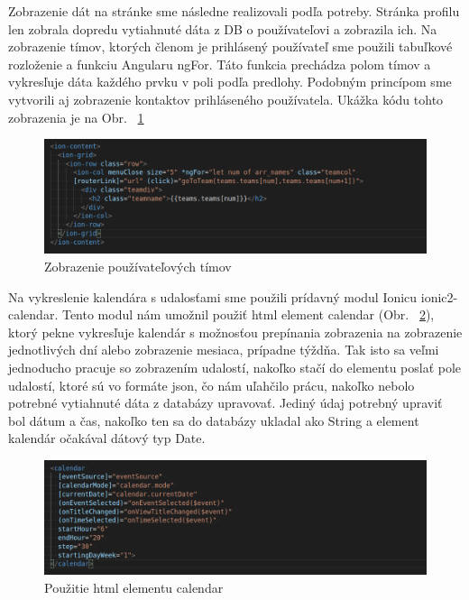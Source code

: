 \indent Zobrazenie dát na stránke sme následne realizovali podľa potreby. Stránka profilu len zobrala dopredu vytiahnuté dáta z DB o používateľovi a zobrazila ich. Na zobrazenie tímov, ktorých členom je prihlásený používateľ sme použili tabuľkové rozloženie a funkciu Angularu ngFor. Táto funkcia prechádza polom tímov a vykresľuje dáta každého prvku v poli podľa predlohy. Podobným princípom sme vytvorili aj zobrazenie kontaktov prihláseného používatela. Ukážka kódu tohto zobrazenia je na Obr. ~\ref{fig:teams}

\begin{figure}[H]
    \centering
    \includegraphics[scale=0.45]{img/imp/teams.png}
    \caption{Zobrazenie používateľových tímov}
    \label{fig:teams}
\end{figure}

\indent Na vykreslenie kalendára s udalosťami sme použili prídavný modul Ionicu ionic2-calendar. Tento modul nám umožnil použiť html element calendar (Obr. ~\ref{fig:calendar}), ktorý pekne vykresľuje kalendár s možnosťou prepínania zobrazenia na zobrazenie jednotlivých dní alebo zobrazenie mesiaca, prípadne týždňa. Tak isto sa veľmi jednoducho pracuje so zobrazením udalostí, nakoľko stačí do elementu poslať pole udalostí, ktoré sú vo formáte json, čo nám uľahčilo prácu, nakoľko nebolo potrebné vytiahnuté dáta z databázy upravovať. Jediný údaj potrebný upraviť bol dátum a čas, nakoľko ten sa do databázy ukladal ako String a element kalendár očakával dátový typ Date.

\begin{figure}[H]
    \centering
    \includegraphics[scale=0.45]{img/imp/calendar_user.png}
    \caption{Použitie html elementu calendar}
    \label{fig:calendar}
\end{figure}

